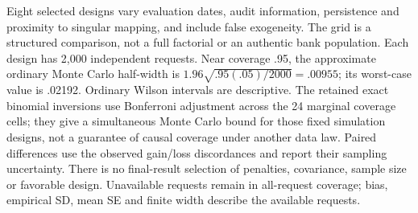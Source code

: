 Eight selected designs vary evaluation dates, audit information, persistence
and proximity to singular mapping, and include false exogeneity. The grid is
a structured comparison, not a full factorial or an authentic bank population.
Each design has 2,000 independent requests. Near coverage .95, the approximate
ordinary Monte Carlo half-width is
$1.96\sqrt{.95(.05)/2000}=.00955$; its worst-case value is .02192. Ordinary
Wilson intervals are descriptive. The retained exact binomial inversions use
Bonferroni adjustment across the 24 marginal coverage cells; they give a
simultaneous Monte Carlo bound for those fixed simulation designs, not a
guarantee of causal coverage under another data law. Paired differences use
the observed gain/loss discordances and report their sampling uncertainty.
There is no final-result selection of penalties, covariance, sample size or
favorable design. Unavailable requests remain in all-request coverage; bias,
empirical SD, mean SE and finite width describe the available requests.



